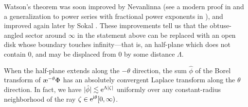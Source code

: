 \documentclass[10pt,a4paper]{amsart}
\newcommand{\aexp}{\text{\rm \ae}}
\numberwithin{equation}{section}
\newcommand{\setfiberscale}[1]{
  \pgfmathsetmacro{\rfiber}{#1}
  \pgfmathsetmacro{\rshade}{1.5*\rfiber}
}
\newcommand{\drawfiber}{
  \foreach \sgn in {-1, 1} {
    \calligraphy[scale=\sgn, copperplate, heavy, heavy line width=0.25mm]
      (\rfiber, \rfiber) -- (\rfiber, -\rfiber)
      (\rfiber, -\rfiber) -- (-\rfiber, -\rfiber);
  }%
}
\newcommand{\fiberdescender}[1]{
  \calligraphy[copperplate, light, thin] (0, -\rfiber) -- (0, -#1);
}
\newcommand{\fibershading}[2]{
  \tikzmath{
    \shadestart = (-90 - #1) / \fiberdeg;
    \shadeend = (90 - #1) / \fiberdeg;
  }
  \fill[pwbeige!30, draw=pwbeige!60] (0, 0) ++(-#1:#2) -- ++(\shadestart:\rshade) arc (\shadestart:\shadeend:\rshade) -- cycle;
}
\newenvironment{fiber}[1][]{%
  \pgfkeys{/laplace/.cd, drop=0, shade=false, degree=1, phase=0, dis=0, #1}
  \begin{scope}
    \fill[surf] (-\rfiber, -\rfiber) rectangle (\rfiber, \rfiber);
    \clip (-\rfiber, -\rfiber) rectangle (\rfiber, \rfiber);
    \tikzmath{
      if \fibershade then {
        print \fibershading{\fiberphase}{\fiberdis};
      };
    }
}{%
  \end{scope}
  \tikzmath{
    if \fiberdrop > 0 then {
      print \fiberdescender{\fiberdrop};
    };
  }
  \drawfiber
}
\newcommand{\genfibercontent}[1][]{
  \pgfkeys{/laplace/.cd, dual=false, #1}
  \pgfmathsetmacro{\hatch}{\rfiber/8}%
  \pgfmathsetmacro{\firsthatch}{-\rfiber+\hatch}
  \pgfmathsetmacro{\nexthatch}{-\rfiber+2*\hatch}
  \pgfmathsetmacro{\hatchstop}{\rfiber-\hatch/2}
  \foreach \y in {\firsthatch, \nexthatch, ..., \hatchstop} {
    \tikzmath{
      coordinate \drawfrom;
      coordinate \drawto;
      if \fiberdual then {
        \drawfrom = (\y, -\rfiber);
        \drawto = (\y, \rfiber);
      } else {
        \drawfrom = (-\rfiber, \y);
        \drawto = (\rfiber, \y);
      };
    }
    \draw[leaf] (\drawfrom) -- (\drawto);
  }%
  \fill circle (\dotsize);
}
\begin{document}
Watson's theorem was soon improved by Nevanlinna \cite{nevanlinna} (see a modern proof in \cite[Theorem~B.15]{nikolaev2023exact} and a generalization to power series with fractional power exponents in \cite{delabaere--rosoamanana}), and improved again later by Sokal \cite{sokal1980improvement}. These improvements tell us that the obtuse-angled sector around $\infty$ in the statement above can be replaced with an open disk whose boundary touches infinity---that is, an half-plane which does not contain $0$, and may be displaced from $0$ by some distance $\Lambda$.
\begin{center}
\end{center}
When the half-plane extends along the $-\theta$ direction, the sum $\hat{\phi}$ of the Borel transform of $\aexp^{-\theta} \Phi$ has an absolutely convergent Laplace transform along the $\theta$ direction. In fact, we have $|\hat{\phi}| \lesssim {\rm e}^{\Lambda |\zeta|}$ uniformly over any constant-radius neighborhood of the ray $\zeta \in {\rm e}^{{\rm i}\theta}[0, \infty)$.
\begin{center}
\end{center}
\end{document}

